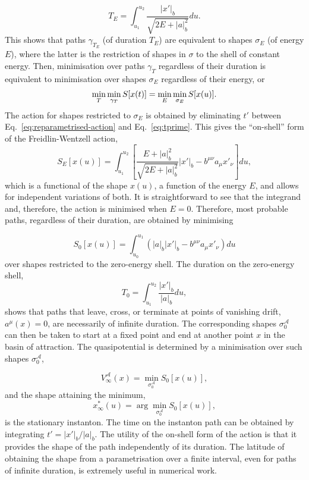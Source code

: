 \begin{equation}
T_{E}=\int_{u_{1}}^{u_{2}}\frac{|x'|_{b}}{\sqrt{2E+|a|_{b}^{2}}}du.\label{eq:path T}
\end{equation}
This shows that paths $\gamma_{T_{E}}$ (of duration $T_{E}$) are
equivalent to shapes $\sigma_{E}$ (of energy $E$), where the latter
is the restriction of shapes in $\sigma$ to the shell of constant
energy. Then, minimisation over paths $\gamma_{T}$ regardless of
their duration is equivalent to minimisation over shapes $\sigma_{E}$
regardless of their energy, or
\[
\min_{T}\min_{\text{\ensuremath{\gamma_{T}}}}S[x(t)]=\min_{E}\min_{\text{\ensuremath{\sigma_{E}}}}S[x(u)].
\]
The action for shapes restricted to $\sigma_{E}$ is obtained by eliminating
$t'$ between Eq.~\ref{eq:reparametrised-action} and Eq.~\ref{eq:tprime}.
This gives the ``on-shell'' form of the Freidlin-Wentzell action,
\[
S_{E}[x(u)]=\int_{u_{1}}^{u_{2}}\left[\frac{E+|a|_{b}^{2}}{\sqrt{2E+|a|_{b}^{2}}}|x'|_{b}-b^{\mu\nu}a_{\mu}x'_{\nu}\right]du,
\]
which is a functional of the shape $x(u)$, a function of the energy
$E$, and allows for independent variations of both. It is straightforward
to see that the integrand and, therefore, the action is minimised
when $E=0$. Therefore, most probable paths, regardless of their duration,
are obtained by minimising

\begin{equation}
S_{0}[x(u)]=\int_{u_{0}}^{u_{1}}\left(|a|_{b}|x'|_{b}-b^{\mu\nu}a_{\mu}x'_{\nu}\right)du
\end{equation}
over shapes restricted to the zero-energy shell. The duration on the
zero-energy shell,
\begin{equation}
T_{0}=\int_{u_{1}}^{u_{2}}\frac{|x'|_{b}}{|a|_{b}}du,
\end{equation}
shows that paths that leave, cross, or terminate at points of vanishing
drift, $a^{\mu}(x)=0$, are necessarily of infinite duration. The
corresponding shapes $\sigma_{0}^{\mathcal{\mathcal{A}}}$ can then
be taken to start at a fixed point and end at another point $x$ in
the basin of attraction. The quasipotential is determined by a minimisation
over such shapes $\sigma_{0}^{\mathcal{A}}$,

\begin{equation}
V_{\infty}^{\mathcal{A}}(x)=\min_{\sigma_{0}^{\mathcal{A}}}S_{0}[x(u)],
\end{equation}
and the shape attaining the minimum,
\begin{equation}
x_{\infty}^{\ast}(u)=\arg\min_{\sigma_{0}^{\mathcal{A}}}S_{0}[x(u)],
\end{equation}
is the stationary instanton. The time on the instanton path can be
obtained by integrating $t'=|x'|_{b}/|a|_{b}$. The utility of the
on-shell form of the action is that it provides the shape of the path
independently of its duration. The latitude of obtaining the shape
from a parametrisation over a finite interval, even for paths of infinite
duration, is extremely useful in numerical work. 

